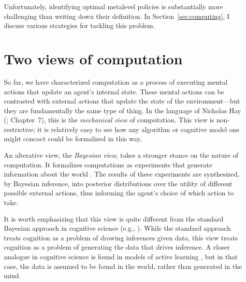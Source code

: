 Unfortunately, identifying optimal metalevel policies is substantially more challenging than writing down their definition. In Section~\ref{sec:computing}, I discuss various strategies for tackling this problem.


\section{Two views of computation}\label{sec:two-views}

So far, we have characterized computation as a process of executing mental actions that update an agent's internal state. These mental actions can be contrasted with external actions that update the state of the environment---but they are fundamentally the same type of thing. In the language of Nicholas Hay (\citeyear{hay2016principles}; Chapter~7), this is the \emph{mechanical view} of computation. This view is non-restrictive; it is relatively easy to see how any algorithm or cognitive model one might concoct could be formalized in this way.

An alterative view, the \emph{Bayesian view}, takes a stronger stance on the nature of computation. It formalizes computations as experiments that generate information about the world \citep{matheson1968economic}. The results of these experiments are synthesized, by Bayesian inference, into posterior distributions over the utility of different possible external actions, thus informing the agent's choice of which action to take. 

It is worth emphasizing that this view is quite different from the standard Bayesian approach in cognitive science (e.g., \citealp{tenenbaum2011how}). While the standard approach treats cognition as a problem of drawing inferences given data, this view treats cognition as a problem of generating the data that drives inference. A closer analogue in cognitive science is found in models of active learning \citep{gureckis2012selfdirected,gottlieb2013informationseeking}, but in that case, the data is assumed to be found in the world, rather than generated in the mind.

